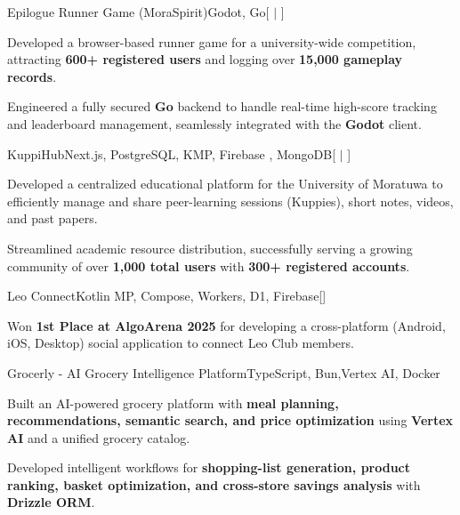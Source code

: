 \documentclass[10pt, letterpaper]{article}
\let\hrefWithoutArrow\href
\renewcommand{\href}[2]{\hrefWithoutArrow{#1}{\ifthenelse{\equal{#2}{}}{ }{#2 }\raisebox{.15ex}{\footnotesize \faExternalLink*}}}
\newcommand{\repo}[1]{\hfill\hrefWithoutArrow{#1}{\faGithub}}
\newcommand{\repolive}[2]{\hfill\hrefWithoutArrow{#1}{\faGithub} $|$ \hrefWithoutArrow{#2}{\faExternalLink*}}
\begin{document}
    \begin{project}{Epilogue Runner Game (MoraSpirit)}{Godot, Go}[\repolive{https://github.com/moraspirit/Godot-Runner-Game}{https://run.moraspirit.com}]
        \item Developed a browser-based runner game for a university-wide competition, attracting \textbf{600+ registered users} and logging over \textbf{15,000 gameplay records}.
        \item Engineered a fully secured \textbf{Go} backend to handle real-time high-score tracking and leaderboard management, seamlessly integrated with the \textbf{Godot} client.
    \end{project}

    \begin{project}{KuppiHub}{Next.js, PostgreSQL, KMP, Firebase , MongoDB}[\repolive{https://github.com/Kuppihub}{https://kuppihub.org}]
        \item Developed a centralized educational platform for the University of Moratuwa to efficiently manage and share peer-learning sessions (Kuppies), short notes, videos, and past papers.
        \item Streamlined academic resource distribution, successfully serving a growing community of over \textbf{1,000 total users} with \textbf{300+ registered accounts}.
    \end{project}

    \begin{project}{Leo Connect}{Kotlin MP, Compose, Workers, D1, Firebase}[\repo{https://github.com/Rexosphere/LeoConnect}]
        \item Won \textbf{1st Place at AlgoArena 2025} for developing a cross-platform (Android, iOS, Desktop) social application to connect Leo Club members.
    \end{project}

    \begin{project}{Grocerly - AI Grocery Intelligence Platform}{TypeScript, Bun,Vertex AI, Docker}
        \item Built an AI-powered grocery platform with \textbf{meal planning, recommendations, semantic search, and price optimization} using \textbf{Vertex AI} and a unified grocery catalog.
        \item Developed intelligent workflows for \textbf{shopping-list generation, product ranking, basket optimization, and cross-store savings analysis} with \textbf{Drizzle ORM}.
    \end{project}
\end{document}
